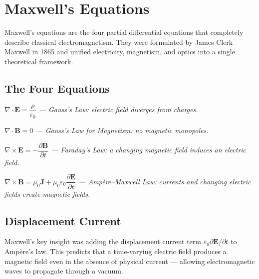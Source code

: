 \section{Maxwell's Equations}\label{sec:wiki_maxwells}



Maxwell's equations are the four partial differential equations that completely describe classical electromagnetism. They were formulated by James Clerk Maxwell in 1865 and unified electricity, magnetism, and optics into a single theoretical framework.

				

\subsection{The Four Equations}

				

\noindent\hspace*{1.2em}\textit{$\nabla \cdot \mathbf{E} = \dfrac{\rho}{\varepsilon_0}$   — Gauss's Law: electric field diverges from charges.}

				

\noindent\hspace*{1.2em}\textit{$\nabla \cdot \mathbf{B} = 0$   — Gauss's Law for Magnetism: no magnetic monopoles.}

				

\noindent\hspace*{1.2em}\textit{$\nabla \times \mathbf{E} = -\dfrac{\partial \mathbf{B}}{\partial t}$   — Faraday's Law: a changing magnetic field induces an electric field.}

				

\noindent\hspace*{1.2em}\textit{$\nabla \times \mathbf{B} = \mu_0\mathbf{J} + \mu_0\varepsilon_0\dfrac{\partial \mathbf{E}}{\partial t}$   — Ampère–Maxwell Law: currents and changing electric fields create magnetic fields.}

				

\subsection{Displacement Current}

				

Maxwell's key insight was adding the displacement current term $\varepsilon_0 \partial\mathbf{E}/\partial t$ to Ampère's law. This predicts that a time-varying electric field produces a magnetic field even in the absence of physical current — allowing electromagnetic waves to propagate through a vacuum.

